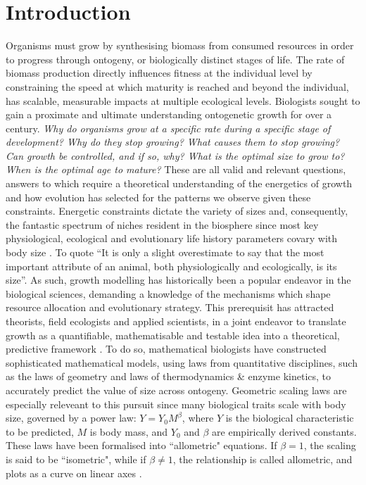 \documentclass[a4paper]{article} %
\begin{document}
\section{Introduction}\thispagestyle{plain}
    Organisms must grow by synthesising biomass from consumed resources in order to progress through ontogeny, or biologically distinct stages of life. The rate of biomass production directly influences fitness at the individual level by constraining the speed at which maturity is reached and beyond the individual, has scalable, measurable impacts at multiple ecological levels. Biologists sought to gain a proximate and ultimate understanding ontogenetic growth for over a century. \textit{Why do organisms grow at a specific rate during a specific stage of development? Why do they stop growing? What causes them to stop growing? Can growth be controlled, and if so, why? What is the optimal size to grow to? When is the optimal age to mature?} These are all valid and relevant questions, answers to which require a theoretical understanding of the energetics of growth and how evolution has selected for the patterns we observe given these constraints. Energetic constraints dictate the variety of sizes and, consequently, the fantastic spectrum of niches resident in the biosphere since most key physiological, ecological and evolutionary life history parameters covary with body size \autocite{peters1983, brown2000-scaling-book,schmidt1984scaling,Marshall2019b}. To quote \cite{Bartholomew1981} ``It is only a slight overestimate to say that the most important attribute of an animal, both physiologically and ecologically, is its size''. As such, growth modelling has historically been a popular endeavor in the biological sciences, demanding a knowledge of the mechanisms which shape resource allocation and evolutionary strategy. This prerequisit has attracted theorists, field ecologists and applied scientists, in a joint endeavor to translate growth as a quantifiable, mathematisable and testable idea into a theoretical, predictive framework \autocite{popper1962,popper1972,peters1983, West2011}. To do so, mathematical biologists have constructed sophisticated mathematical models, using laws from quantitative disciplines, such as the laws of geometry and laws of thermodynamics \& enzyme kinetics, to accurately predict the value of size across ontogeny. Geometric scaling laws are especially releveant to this pursuit since many biological traits scale with body size, governed by a power law: $Y = Y_0 M^{\beta}$, where $Y$ is the biological characteristic to be predicted, $M$ is body mass, and $Y_0$ and $\beta$ are empirically derived constants. These laws have been formalised into ``allometric" equations. If $\beta = 1$, the scaling is said to be ``isometric", while if $\beta \neq 1$, the relationship is called allometric, and plots as a curve on linear axes \autocite{brown2000-scaling-book}.
\end{document}
